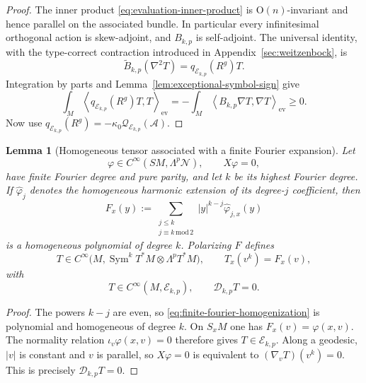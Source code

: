 \documentclass[reqno,11pt]{amsart}
\newtheorem{lemma}[theorem]{Lemma}
\theoremstyle{definition}
\newcommand{\SM}{SM}
\newcommand{\cN}{\mathcal N}
\newcommand{\cA}{\mathcal A}
\newcommand{\cQ}{\mathcal Q}
\newcommand{\Sym}{\operatorname{Sym}}
\newcommand{\cD}{\mathcal D}
\newcommand{\inner}[2]{\left\langle #1,#2\right\rangle}
\begin{document}
\begin{proof}
The inner product \eqref{eq:evaluation-inner-product} is
$\mathrm O(n)$-invariant and hence parallel on the associated bundle.  In
particular every infinitesimal orthogonal action is skew-adjoint, and
$B_{k,p}$ is self-adjoint.  The universal identity, with the type-correct
contraction introduced in Appendix~\ref{sec:weitzenbock}, is
$$
 \widetilde B_{k,p}(\nabla^2T)=q_{\mathscr E_{k,p}}(R^g)T.
$$
Integration by parts and Lemma~\ref{lem:exceptional-symbol-sign} give
$$
 \int_M\inner{q_{\mathscr E_{k,p}}(R^g)T}{T}_{\mathrm{ev}}
 =-\int_M\inner{B_{k,p}\nabla T}{\nabla T}_{\mathrm{ev}}\geq0.
$$
Now use $q_{\mathscr E_{k,p}}(R^g)=-\kappa_0\cQ_{\mathscr E_{k,p}}(\cA)$.
\end{proof}

\begin{lemma}[Homogeneous tensor associated with a finite Fourier expansion]
\label{lem:finite-fourier-homogenization}
Let
$$
 \varphi\in C^\infty(\SM,\Lambda^p\cN),
 \qquad X\varphi=0,
$$
have finite Fourier degree and pure parity, and let $k$ be its highest
Fourier degree.  If $\widehat\varphi_j$ denotes the homogeneous harmonic
extension of its degree-$j$ coefficient, then
\begin{equation}\label{eq:finite-fourier-homogenization}
 F_x(y):=
 \sum_{\substack{j\leq k\\j\equiv k\,\mathrm{mod}\,2}}
 |y|^{k-j}\widehat\varphi_{j,x}(y)
\end{equation}
is a homogeneous polynomial of degree $k$.  Polarizing $F$ defines
\begin{equation*}
 T\in C^\infty
 \bigl(M,\Sym^kT^*M\otimes\Lambda^pT^*M\bigr),
 \qquad T_x(v^k)=F_x(v),
\end{equation*}
with
$$
 T\in C^\infty(M,\mathscr E_{k,p}),
 \qquad \cD_{k,p}T=0.
$$
\end{lemma}

\begin{proof}
The powers $k-j$ are even, so \eqref{eq:finite-fourier-homogenization} is
polynomial and homogeneous of degree $k$.  On $S_xM$ one has
$F_x(v)=\varphi(x,v)$.  The normality relation
$\iota_v\varphi(x,v)=0$ therefore gives
$T\in\mathscr E_{k,p}$.  Along a geodesic, $|v|$ is constant and $v$ is
parallel, so $X\varphi=0$ is equivalent to
$(\nabla_vT)(v^k)=0$.  This is precisely $\cD_{k,p}T=0$.
\end{proof}
\end{document}
